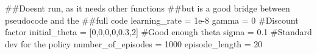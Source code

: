 \documentclass[
  letterpaper,
]{report}
\newenvironment{Shaded}{\begin{snugshade}}{\end{snugshade}}
\newcommand{\CommentTok}[1]{\textcolor[rgb]{0.37,0.37,0.37}{#1}}
\newcommand{\DecValTok}[1]{\textcolor[rgb]{0.68,0.00,0.00}{#1}}
\newcommand{\FloatTok}[1]{\textcolor[rgb]{0.68,0.00,0.00}{#1}}
\newcommand{\NormalTok}[1]{\textcolor[rgb]{0.00,0.23,0.31}{#1}}
\newcommand{\OperatorTok}[1]{\textcolor[rgb]{0.37,0.37,0.37}{#1}}
\theoremstyle{plain}
\theoremstyle{definition}
\theoremstyle{definition}
\theoremstyle{remark}
\begin{document}
\begin{Shaded}
\begin{Highlighting}[]
\CommentTok{\#\#Doesn\textquotesingle{}t run, as it needs other functions}
\CommentTok{\#\#but is a good bridge between pseudocode and the}
\CommentTok{\#\#full code}
\NormalTok{learning\_rate }\OperatorTok{=} \FloatTok{1e{-}8}
\NormalTok{gamma }\OperatorTok{=} \DecValTok{0} \CommentTok{\#Discount factor}
\NormalTok{initial\_theta }\OperatorTok{=}\NormalTok{ [}\DecValTok{0}\NormalTok{,}\DecValTok{0}\NormalTok{,}\DecValTok{0}\NormalTok{,}\DecValTok{0}\NormalTok{,}\FloatTok{0.3}\NormalTok{,}\DecValTok{2}\NormalTok{] }\CommentTok{\#Good enough theta}
\NormalTok{sigma }\OperatorTok{=} \FloatTok{0.1} \CommentTok{\#Standard dev for the policy}
\NormalTok{number\_of\_episodes }\OperatorTok{=} \DecValTok{1000} 
\NormalTok{episode\_length }\OperatorTok{=} \DecValTok{20}



\end{Highlighting}
\end{Shaded}
\end{document}
